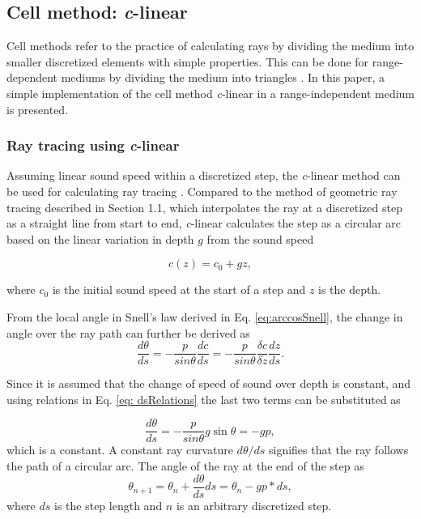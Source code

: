 \documentclass[fleqn]{jaes}
\begin{document}
\subsection{Cell method: \textit{c}-linear}
Cell methods refer to the practice of calculating rays by dividing the medium into smaller discretized elements with simple properties. This can be done for range-dependent mediums by dividing the medium into triangles \cite{Jensen}. In this paper, a simple implementation of the cell method \textit{c}-linear in a range-independent medium is presented. 

\subsubsection{Ray tracing using \textit{c}-linear}
Assuming linear sound speed within a discretized step, the \textit{c}-linear method can be used for calculating ray tracing \cite{Jensen}. Compared to the method of geometric ray tracing described in Section 1.1, which interpolates the ray at a discretized step as a straight line from start to end, \textit{c}-linear calculates the step as a circular arc based on the linear variation in depth $g$ from the sound speed

\begin{equation}
c(z) = c_0+gz,
\label{eq:linearSpeed}
\end{equation}

where $c_0$ is the initial sound speed at the start of a step and $z$ is the depth. 

From the local angle in Snell's law derived in Eq. \ref{eq:arccosSnell}, the change in angle over the ray path can further be derived as
\begin{equation}
    \frac{d\theta}{ds}= -\frac{p}{sin\theta}\frac{dc}{ds} = -\frac{p}{sin\theta}\frac{\delta c}{\delta z} \frac{dz}{ds}.
\end{equation}

Since it is assumed that the change of speed of sound over depth is constant, and using relations in Eq. \ref{eq: dsRelations} the last two terms can be substituted as

\begin{equation}
    \frac{d\theta}{ds} = -\frac{p}{sin\theta}g \sin\theta = -gp,
\end{equation}
which is a constant. A constant ray curvature $d\theta/ds$ signifies that the ray follows the path of a circular arc. The angle of the ray at the end of the step as
\begin{equation}
    \theta_{n+1}=\theta_n+\frac{d\theta}{ds}ds=\theta_n-gp*ds,
\end{equation}
where $ds$ is the step length and $n$ is an arbitrary discretized step.
\end{document}
